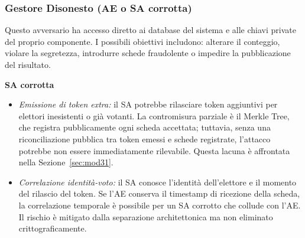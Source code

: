\documentclass[12pt,a4paper]{article}
\begin{document}
\subsubsection{Gestore Disonesto (AE o SA corrotta)}

Questo avversario ha accesso diretto ai database del sistema e alle chiavi private del proprio componente. I possibili obiettivi includono: alterare il conteggio, violare la segretezza, introdurre schede fraudolente o impedire la pubblicazione del risultato.

\textbf{SA corrotta}
\begin{itemize}
  \item \textit{Emissione di token extra:} il SA potrebbe rilasciare token aggiuntivi per elettori inesistenti o già votanti. La contromisura parziale è il Merkle Tree, che registra pubblicamente ogni scheda accettata; tuttavia, senza una riconciliazione pubblica tra token emessi e schede registrate, l'attacco potrebbe non essere immediatamente rilevabile. Questa lacuna è affrontata nella Sezione~\ref{sec:mod31}.
  \item \textit{Correlazione identità-voto:} il SA conosce l'identità dell'elettore e il momento del rilascio del token. Se l'AE conserva il timestamp di ricezione della scheda, la correlazione temporale è possibile per un SA corrotto che collude con l'AE. Il rischio è mitigato dalla separazione architettonica ma non eliminato crittograficamente.
\end{itemize}
\end{document}
